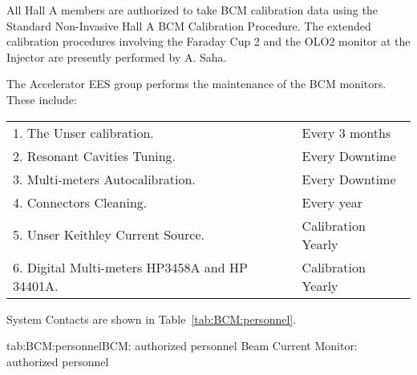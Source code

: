 All Hall A members are authorized to take BCM calibration data using the Standard 
Non-Invasive Hall A BCM Calibration Procedure. The extended calibration procedures 
involving the Faraday Cup 2 and the OLO2 monitor at the Injector are presently 
performed by A. Saha. 

\vskip 0.2cm

The Accelerator EES group performs the maintenance of the BCM monitors. These 
include:

\begin{tabular}{l l}
1. The Unser calibration. & Every 3 months \\
2. Resonant Cavities Tuning. & Every Downtime \\
3. Multi-meters Autocalibration. & Every Downtime \\
4. Connectors Cleaning. &  Every year \\
5. Unser Keithley Current Source. & Calibration Yearly \\
6. Digital Multi-meters HP3458A and HP 34401A. & Calibration Yearly\\   
\end{tabular}

System Contacts are shown in Table~\ref{tab:BCM:personnel}.
\begin{namestab}{tab:BCM:personnel}{BCM: authorized personnel}{%
   Beam Current Monitor: authorized personnel}
\end{namestab}




